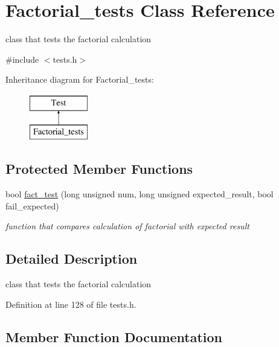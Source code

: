 \hypertarget{class_factorial__tests}{}\section{Factorial\+\_\+tests Class Reference}
\label{class_factorial__tests}


class that tests the factorial calculation  




{\ttfamily \#include $<$tests.\+h$>$}

Inheritance diagram for Factorial\+\_\+tests\+:\begin{figure}[H]
\begin{center}
\leavevmode
\includegraphics[height=2.000000cm]{class_factorial__tests}
\end{center}
\end{figure}
\subsection*{Protected Member Functions}
\begin{DoxyCompactItemize}
\item 
bool \mbox{\hyperlink{class_factorial__tests_aacc538b1427a2ad89e8d25cd0d5b717c}{fact\+\_\+test}} (long unsigned num, long unsigned expected\+\_\+result, bool fail\+\_\+expected)
\begin{DoxyCompactList}\small\item\em function that compares calculation of factorial with expected result \end{DoxyCompactList}\end{DoxyCompactItemize}


\subsection{Detailed Description}
class that tests the factorial calculation 

Definition at line 128 of file tests.\+h.



\subsection{Member Function Documentation}
\mbox{\label{class_factorial__tests_aacc538b1427a2ad89e8d25cd0d5b717c}} 
